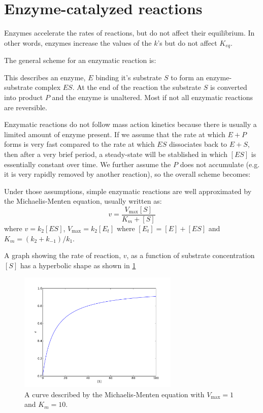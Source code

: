 \documentclass[11pt,letterpaper,oneside,pagesize]{scrartcl}
\begin{document}
\section{Enzyme-catalyzed reactions}

Enzymes accelerate the rates of reactions, but do not affect their equilibrium. In other words, enzymes increase the values of the $k$'s but do not affect $K_{eq}$.

The general scheme for an enzymatic reaction is:

\begin{center}
\end{center}
%
This describes an enzyme, $E$ binding it's substrate $S$ to form an enzyme-substrate complex $ES$. At the end of the reaction the substrate $S$ is converted into product $P$ and the enzyme is unaltered. Most if not all enzymatic reactions are reversible.

Enzymatic reactions do not follow mass action kinetics because there is usually a limited amount of enzyme present. If we assume that the rate at which $E + P$ forms is very fast compared to the rate at which $ES$ dissociates back to $E + S$, then after a very brief period, a steady-state will be stablished in which $[ES]$ is essentially constant over time. We further assume the $P$ does not accumulate (e.g. it is very rapidly removed by another reaction), so the overall scheme becomes:
%
\begin{center}
\end{center}
%
Under those assumptions, simple enzymatic reactions are well approximated by the Michaelis-Menten equation, usually written as:
\[
v = \frac{V_{\max}[S]}{K_m + [S]}
\]
where $v = k_2[ES]$, $V_{\max} = k_2[E_t]$ where $[E_t] = [E] + [ES]$ and $K_m = (k_2+k_{-1})/k_1$.

A graph showing the rate of reaction, $v$, as a function of substrate concentration $[S]$ has a hyperbolic shape as shown in \cref{fig:michaelis}

\begin{figure}[lh]
\centering
 \includegraphics[width=3in]{michaelis-curve.pdf}
\caption{A curve described by the Michaelis-Menten equation with $V_{\max}=1$ and $K_m = 10$.}
\label{fig:michaelis}
\end{figure}
\end{document}
